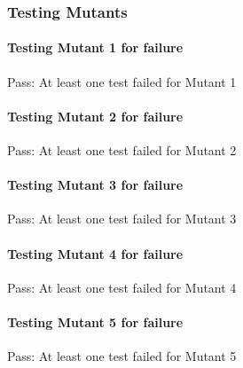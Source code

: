\subsubsection*{Testing Mutants}

\paragraph*{Testing Mutant 1 for failure}


\begin{DoxyItemize}
\item Pass\+: At least one test failed for Mutant 1
\end{DoxyItemize}

\paragraph*{Testing Mutant 2 for failure}


\begin{DoxyItemize}
\item Pass\+: At least one test failed for Mutant 2
\end{DoxyItemize}

\paragraph*{Testing Mutant 3 for failure}


\begin{DoxyItemize}
\item Pass\+: At least one test failed for Mutant 3
\end{DoxyItemize}

\paragraph*{Testing Mutant 4 for failure}


\begin{DoxyItemize}
\item Pass\+: At least one test failed for Mutant 4
\end{DoxyItemize}

\paragraph*{Testing Mutant 5 for failure}


\begin{DoxyItemize}
\item Pass\+: At least one test failed for Mutant 5
\end{DoxyItemize}

